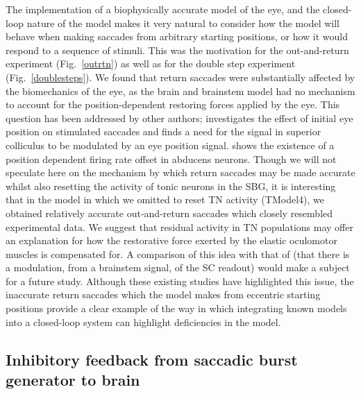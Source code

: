 \documentclass{frontiersSCNS}
\begin{document}
The implementation of a biophysically accurate model of the eye, and
the closed-loop nature of the model makes it very natural to consider
how the model will behave when making saccades from arbitrary starting
positions, or how it would respond to a sequence of stimuli. This was
the motivation for the out-and-return experiment (Fig.~\ref{outrtn})
as well as for the double step experiment (Fig.~\ref{doublesteps}).
We found that return saccades were substantially affected by the
biomechanics of the eye, as the brain and brainstem model had no
mechanism to account for the position-dependent restoring forces
applied by the eye. This question has been addressed by other authors;
\cite{groh_effects_2011} investigates the effect of
initial eye position on stimulated saccades and finds a need for the
signal in superior colliculus to be modulated by an eye position
signal. \cite{ling_effects_2007} shows the existence of a position
dependent firing rate offset in abducens neurons. Though we will not
speculate here on the mechanism by which return saccades may be made
accurate whilst also resetting the activity of tonic neurons in the
SBG, it is interesting that in the model in which we omitted to reset
TN activity (TModel4), we obtained relatively accurate out-and-return
saccades which closely resembled experimental data.  We suggest that
residual activity in TN populations may offer an explanation for how
the restorative force exerted by the elastic oculomotor muscles is
compensated for. A comparison of this idea with that
of \cite{groh_effects_2011} (that there is a modulation, from a
brainstem signal, of the SC readout) would make a subject for a future
study. Although these existing studies have highlighted this issue,
the inaccurate return saccades which the model makes from eccentric
starting positions provide a clear example of the way in which
integrating known models into a closed-loop system can highlight
deficiencies in the model.

\subsection{Inhibitory feedback from saccadic burst generator to brain}
\end{document}
